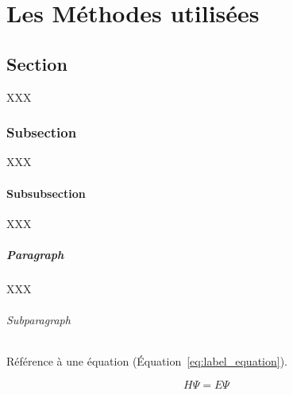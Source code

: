 \chapter{Les Méthodes utilisées}
\label{chap:methodes_pratiques}
 
\section{Section}

XXX

\subsection{Subsection}

XXX

\subsubsection{Subsubsection}

XXX

\paragraph{Paragraph}

XXX

\subparagraph{Subparagraph}

Référence à une équation (Équation~\ref{eq:label_equation}).

\begin{equation}
H \Psi = E \Psi
\label{eq:label_equation}
\end{equation}
